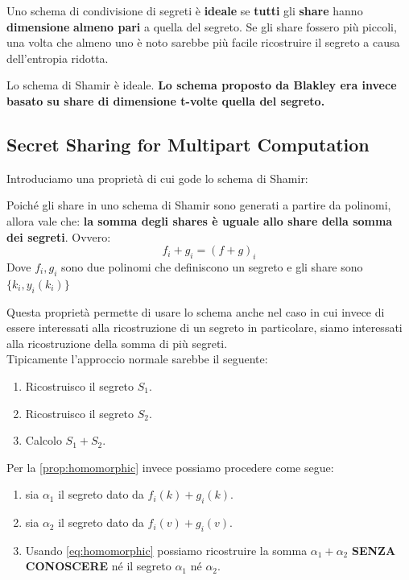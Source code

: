 \begin{corollary}
Uno schema di condivisione di segreti è \textbf{ideale} se \textbf{tutti} gli \textbf{share} hanno \textbf{dimensione} \textbf{almeno pari} a quella del segreto. Se gli share fossero più piccoli, una volta che almeno uno è noto sarebbe più facile ricostruire il segreto a causa dell'entropia ridotta.
\end{corollary}
\begin{remark}
Lo schema di Shamir è ideale.\textbf{ Lo schema proposto da Blakley era invece basato su share di dimensione t-volte quella del segreto.}
\end{remark}
\subsection{Secret Sharing for Multipart Computation}
Introduciamo una proprietà di cui gode lo schema di Shamir:
\begin{proposition}\label{prop:homomorphic}
Poiché gli share in uno schema di Shamir sono generati a partire da polinomi, allora vale che: \textbf{la somma degli shares è uguale allo share della somma dei segreti}. Ovvero:
\begin{equation}\label{eq:homomorphic}
    f_i+g_i = (f+g)_i
\end{equation}
Dove $f_i,g_i$ sono due polinomi che definiscono un segreto e gli share sono $\{k_i,y_i(k_i)\}$
\end{proposition}
Questa proprietà permette di usare lo schema anche nel caso in cui invece di essere interessati alla ricostruzione di un segreto in particolare, siamo interessati alla ricostruzione della somma di più segreti.\\
Tipicamente l'approccio normale sarebbe il seguente:
\begin{enumerate}
    \item Ricostruisco il segreto $S_1$.
    \item Ricostruisco il segreto $S_2$.
    \item Calcolo $S_1+S_2$.
\end{enumerate}
Per la \cref{prop:homomorphic} invece possiamo procedere come segue:
\begin{enumerate}
    \item sia $\alpha_1$ il segreto dato da $f_i(k)+g_i(k)$.
    \item sia $\alpha_2$ il segreto dato da $f_i(v)+g_i(v)$.
    \item Usando \cref{eq:homomorphic} possiamo ricostruire la somma $\alpha_1+\alpha_2$ \textbf{SENZA CONOSCERE} né il segreto $\alpha_1$ né $\alpha_2$.
\end{enumerate}
